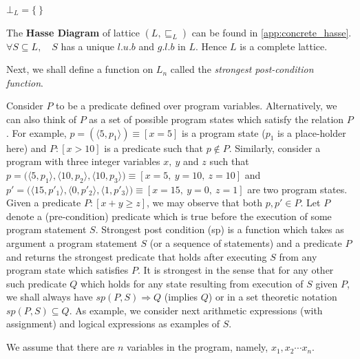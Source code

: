 \documentclass[final,3p, review, times]{util/elsarticle}
\begin{document}
$\bot_L=\big\{\ \big\}$

The \textbf{Hasse Diagram} of lattice $(L,\sqsubseteq_L)$ can be found in \ref{app:concrete_hasse}. $\forall S\subseteq L,\quad S$ has a unique $l.u.b$ and $g.l.b$ in $L$. Hence $L$ is a complete lattice.

Next, we shall define a function on $L_n$ called the \textit{strongest post-condition function}\cite{lara13}.

Consider $P$ to be a predicate defined over program variables. Alternatively, we can also think of $P$ as a set of possible program states which satisfy the relation $P$. For example, $p=(\langle5,p_1\rangle)\equiv[x=5]$ is a program state ($p_1$ is a place-holder here) and $P:[x>10]$ is a predicate such that $p\notin P$. Similarly, consider a program with three integer variables $x,\ y$ and $z$ such that $p=\big(\langle5,p_1\rangle,\langle10,p_2\rangle,\langle10,p_3\rangle\big)\equiv[x=5,\ y=10,\ z=10]$ and $p'=\big(\langle15,p'_1\rangle,\langle0,p'_2\rangle,\langle1,p'_3\rangle\big)\equiv[x=15,\ y=0,\ z=1]$ are two program states. Given a predicate $P:[x+y\geq z]$, we may observe that both $p,p'\in P$. Let $P$ denote a (pre-condition) predicate which is true before the execution of some program statement $S$. Strongest post condition (sp) is a function which takes as argument a program statement $S$ (or a sequence of statements) and a predicate $P$ and returns the strongest predicate that holds after executing $S$ from any program state which satisfies $P$. It is strongest in the sense that for any other such predicate $Q$ which holds for any state resulting from execution of $S$ given $P$, we shall always have $sp(P,S)\Rightarrow Q$ (implies $Q$) or in a set theoretic notation $sp(P,S)\subseteq Q$. As example, we consider next arithmetic expressions (with assignment) and logical expressions as examples of $S$.

We assume that there are $n$ variables in the program, namely, $x_1,x_2\cdots x_n$.
\end{document}
